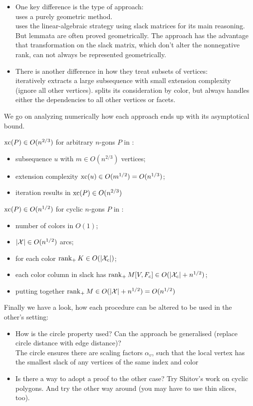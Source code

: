 \begin{itemize}
  \item One key difference is the type of approach:\\
  \cite{shitov2020sublinear} uses a purely geometric method.\\
  \cite{kwan2020extension} uses the linear-algebraic strategy using slack matrices for its main reasoning. But lemmata are often proved geometrically. The approach has the advantage that transformation on the slack matrix, which don't alter the nonnegative rank, can not always be represented geometrically.

  \item There is another difference in how they treat subsets of vertices:\\
  \cite{shitov2020sublinear} iteratively extracts a large subsequence with small extension complexity (ignore all other vertices).
  \cite{kwan2020extension} splits its consideration by color, but always handles either the dependencies to all other vertices or facets. 
\end{itemize}

We go on analyzing numerically how each approach ends up with its asymptotical bound.

$\operatorname{xc}(P) \in O(n^{2/3})$ for arbitrary $n$-gons $P$ in \cite{shitov2020sublinear}:
\begin{itemize}
  \item subsequence $u$ with $m \in O(n^{2/3})$ vertices;
  \item extension complexity $\operatorname{xc}(u) \in O(m^{1/2}) = O(n^{1/3})$;
  \item iteration results in $\operatorname{xc}(P) \in O(n^{2/3})$
\end{itemize}

$\operatorname{xc}(P) \in O(n^{1/2})$ for cyclic $n$-gons $P$ in \cite{kwan2020extension}:
\begin{itemize}
  \item number of colors in $O(1)$;
  \item $\lvert\mathcal{X}\rvert \in O(n^{1/2})$ arcs;
  \item for each color $\operatorname{rank}_+ K \in O(\lvert\mathcal{X}_c\rvert)$;
  \item each color column in slack has $\operatorname{rank}_+ M[V,F_c] \in O(\lvert\mathcal{X}_c\rvert + n^{1/2})$;
  \item putting together $\operatorname{rank}_+ M \in O(\lvert\mathcal{X}\rvert + n^{1/2}) = O(n^{1/2})$
\end{itemize}

Finally we have a look, how each procedure can be altered to be used in the other's setting:

\begin{itemize}
  \item How is the circle property used? Can the approach be generalised (replace circle distance with edge distance)?\\
  The circle ensures there are scaling factors $\alpha_v$, such that the local vertex has the smallest slack of any vertices of the same index and color
  \item Is there a way to adopt a proof to the other case? Try Shitov's work on cyclic polygons. And try the other way around (you may have to use thin slices, too).
\end{itemize}
